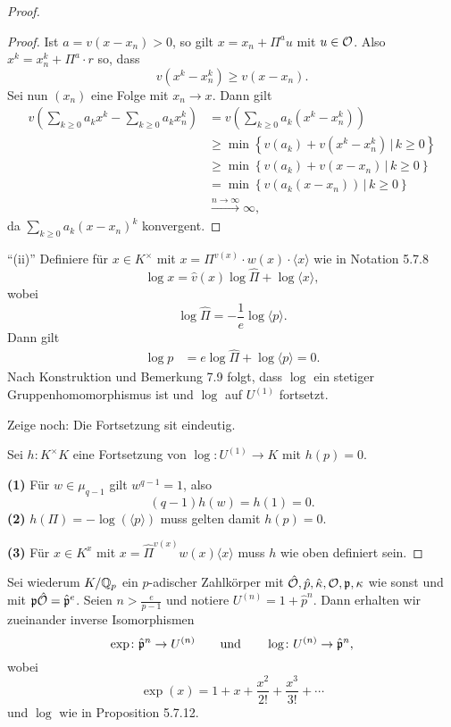 \begin{proof}
\begin{proof}
Ist $a = v(x-x_n)>0$, so gilt $x = x_n + \Pi^a u$ mit $u \in \mathcal{O}$. Also
$x^k = x_n^k + \Pi^a \cdot r$ so, dass 
\[ v\left( x^k - x_n^k \right) \geq v\left( x - x_n \right).
\]
Sei nun $(x_n)$ eine Folge mit $x_n \to x$. Dann gilt
\begin{align*}
v \left( \sum_{k \geq 0} a_k x^k - \sum_{k \geq 0} a_k x_n^k  \right)
&= v \left( \sum_{k \geq 0} a_k \left(x^k - x_n^k\right)  \right) \\
&\geq \min \left\{ v(a_k) + v\left( x^k - x_n^k \right) \, | \, k \geq 0 \right\} \\
&\geq \min \left\{ v(a_k) + v\left( x - x_n \right) \, | \, k \geq 0 \right\} \\
&=\min \left\{ v\left( a_k \left(x - x_n \right)\right) \, | \, k \geq 0 \right\} \\
&\xrightarrow{n \to \infty} \infty,
\end{align*}
da $\sum_{k \geq 0} a_k (x-x_n)^k$ konvergent.
\end{proof}

\enquote{(ii)} Definiere für $x \in K^\times$ mit $ x = \Pi^{v(x)} \cdot w(x) \cdot \langle x \rangle$ wie in Notation 5.7.8
\[ \log x = \hat{v}(x) \log \hat{\Pi} + \log \langle x \rangle,
\]
wobei
\[ \log \hat{\Pi} = - \frac{1}{e} \log \langle p \rangle.
\]
Dann gilt
\begin{align*}
\log p
&= e \log \hat{\Pi} + \log \langle p \rangle 
= 0.
\end{align*}
Nach Konstruktion und Bemerkung 7.9 folgt, dass $\log$ ein stetiger Gruppenhomomorphismus ist und $\log$ auf $U^{(1)}$ fortsetzt.

\bigskip Zeige noch: Die Fortsetzung sit eindeutig.

Sei $h\colon K^\times K$ eine Fortsetzung von $\log \colon U^{(1)} \to K$ mit $h(p)=0$.

\textbf{(1)} Für $w \in \mu_{q-1}$ gilt $w^{q-1} = 1$, also
\[ (q-1)h(w) = h(1) = 0.
\]
\textbf{(2)} $h(\Pi) = - \log (\langle p \rangle)$ muss gelten damit $h(p) = 0$.

\textbf{(3)} Für $x\in K^x$ mit $x=\hat{\Pi}^{v(x)}w(x) \langle x \rangle$ muss $h$ wie oben definiert sein.
\end{proof}


\begin{Prop}
Sei wiederum $K/\mathbb{Q}_p$ ein $p$-adischer Zahlkörper mit $\hat{\mathcal{O}}, \hat{p}, \hat{\kappa}, \mathcal{O}, \mathfrak{p}, \kappa$ wie sonst und mit $\mathfrak{p}\hat{\mathcal{O}} = \hat{\mathfrak{p}}^e$. Seien $n > \frac{e}{p-1}$ und notiere $U^{(n)} = 1 + \hat{p}^n $. Dann erhalten wir zueinander inverse Isomorphismen
\[ \exp \colon \hat{\mathfrak{p}}^n  \to U^{(n)} \qquad \text{und} \qquad 
\log \colon   U^{(n)} \to \hat{\mathfrak{p}}^n,
\]
wobei 
\[ \exp(x) = 1+ x + \frac{x^2}{2!} + \frac{x^3}{3!} + \cdots
\]
und $\log$ wie in Proposition 5.7.12.
\end{Prop}

